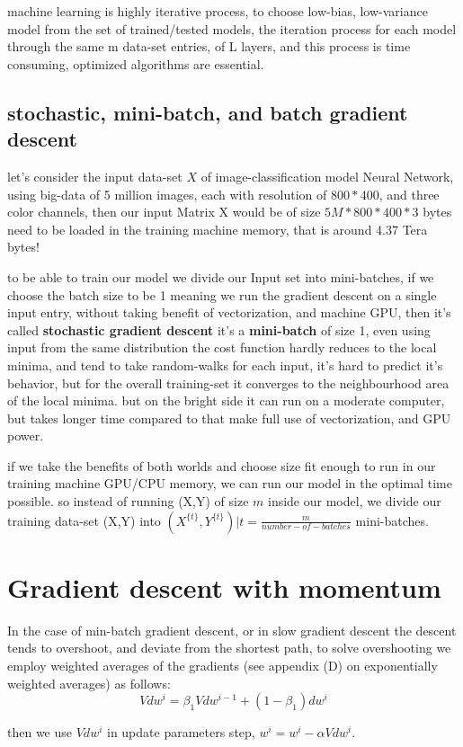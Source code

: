 \documentclass[4apaper,12pt]{book}
\begin{document}
\begin {description}
\item machine learning is highly iterative process, to choose low-bias, low-variance model from the set of trained/tested models, the iteration process for each model through the same m data-set entries, of L layers, and this process is time consuming, optimized algorithms are essential.
  \subsection{stochastic, mini-batch, and batch gradient descent}
\item let's consider the input data-set $X$ of image-classification model Neural Network, using big-data of 5 million images, each with resolution of $800*400$, and three color channels, then our input Matrix X would be of size $5M*800*400*3$ bytes need to be loaded in the training machine memory, that is around 4.37 Tera bytes!
\item to be able to train our model we divide our Input set into mini-batches, if we choose the batch size to be 1 meaning we run the gradient descent on a single input entry, without taking benefit of vectorization, and machine GPU, then it's called \textbf{stochastic gradient descent} it's a \textbf{mini-batch} of size 1, even using input from the same distribution the cost function hardly reduces to the local minima, and tend to take random-walks for each input, it's hard to predict it's behavior, but for the overall training-set it converges to the neighbourhood area of the local minima. but on the bright side it can run on a moderate computer, but takes longer time compared to  that make full use of vectorization, and GPU power.
\item if we take the benefits of both worlds and choose  size fit enough to run in our training machine GPU/CPU memory, we can run our model in the  optimal time possible. so instead of running (X,Y) of size $m$ inside our model, we divide our training data-set (X,Y) into $(X^{\{t\}}, Y^{\{t\}}) | t=\frac{m}{number-of-batches}$ mini-batches.

\end{description}

\section{Gradient descent with momentum}
\begin{description}
\item  In the case of min-batch gradient descent, or in slow gradient descent the descent tends to overshoot, and deviate from the shortest path, to solve overshooting we employ weighted averages of the gradients (see appendix (D) on exponentially weighted averages) as follows: $$ Vdw^i = \beta_1 Vdw^{i-1} + (1-\beta_1) dw^i $$
\item then we use $Vdw^i$ in update parameters step, $w^i = w^i - \alpha Vdw^i$.
  \end{description}
\end{document}
